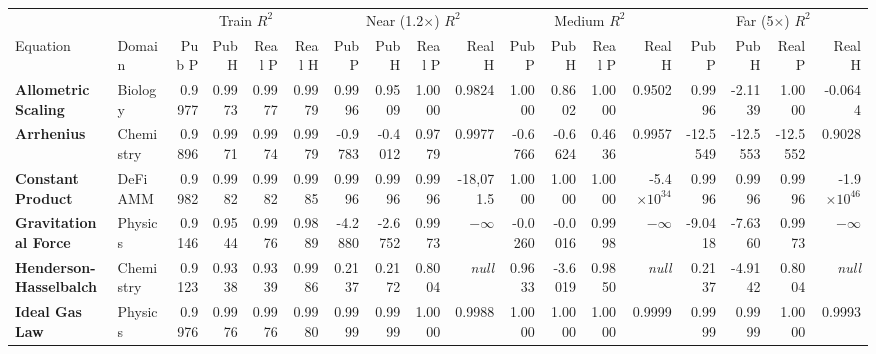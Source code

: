 \documentclass[10pt]{article}
\begin{document}
\begin{landscape}
\begin{adjustbox}{width=\linewidth,center}
\begin{tabular}{l l *{4}{r} *{4}{r} *{4}{r} *{4}{r}}
\toprule
& & \multicolumn{4}{c}{Train $R^2$} & \multicolumn{4}{c}{Near (1.2$\times$) $R^2$} & \multicolumn{4}{c}{Medium $R^2$} & \multicolumn{4}{c}{Far (5$\times$) $R^2$} \\
\cmidrule(lr){3-6} \cmidrule(lr){7-10} \cmidrule(lr){11-14} \cmidrule(lr){15-18}
Equation & Domain & Pub P & Pub H & Real P & Real H & Pub P & Pub H & Real P & Real H & Pub P & Pub H & Real P & Real H & Pub P & Pub H & Real P & Real H \\
\midrule
\textbf{Allometric Scaling} & Biology & 0.9977 & 0.9973 & \cellcolor{match}0.9977 & \cellcolor{match}0.9979 & 0.9996 & 0.9509 & \cellcolor{match}1.0000 & \cellcolor{minor}0.9824 & 1.0000 & 0.8602 & \cellcolor{match}1.0000 & \cellcolor{minor}0.9502 & 0.9996 & -2.1139 & \cellcolor{match}1.0000 & \cellcolor{major}-0.0644 \\
\textbf{Arrhenius} & Chemistry & 0.9896 & 0.9971 & \cellcolor{match}0.9974 & \cellcolor{match}0.9979 & -0.9783 & -0.4012 & \cellcolor{major}0.9779 & \cellcolor{major}0.9977 & -0.6766 & -0.6624 & \cellcolor{major}0.4636 & \cellcolor{major}0.9957 & -12.5549 & -12.5553 & \cellcolor{match}-12.5552 & \cellcolor{major}0.9028 \\
\textbf{Constant Product} & DeFi AMM & 0.9982 & 0.9982 & \cellcolor{match}0.9982 & \cellcolor{match}0.9985 & 0.9996 & 0.9996 & \cellcolor{match}0.9996 & \cellcolor{major}-18{,}071.5 & 1.0000 & 1.0000 & \cellcolor{match}1.0000 & \cellcolor{major}-5.4$\times10^{34}$ & 0.9996 & 0.9996 & \cellcolor{match}0.9996 & \cellcolor{major}-1.9$\times10^{46}$ \\
\textbf{Gravitational Force} & Physics & 0.9146 & 0.9544 & \cellcolor{minor}0.9976 & \cellcolor{minor}0.9889 & -4.2880 & -2.6752 & \cellcolor{major}0.9973 & \cellcolor{major}$-\infty$ & -0.0260 & -0.0016 & \cellcolor{major}0.9998 & \cellcolor{major}$-\infty$ & -9.0418 & -7.6360 & \cellcolor{major}0.9973 & \cellcolor{major}$-\infty$ \\
\textbf{Henderson-Hasselbalch} & Chemistry & 0.9123 & 0.9338 & \cellcolor{minor}0.9339 & \cellcolor{minor}0.9986 & 0.2137 & 0.2172 & \cellcolor{major}0.8004 & \cellcolor{major}\textit{null} & 0.9633 & -3.6019 & \cellcolor{minor}0.9850 & \cellcolor{major}\textit{null} & 0.2137 & -4.9142 & \cellcolor{major}0.8004 & \cellcolor{major}\textit{null} \\
\textbf{Ideal Gas Law} & Physics & 0.9976 & 0.9976 & \cellcolor{match}0.9976 & \cellcolor{match}0.9980 & 0.9999 & 0.9999 & \cellcolor{match}1.0000 & \cellcolor{match}0.9988 & 1.0000 & 1.0000 & \cellcolor{match}1.0000 & \cellcolor{match}0.9999 & 0.9999 & 0.9999 & \cellcolor{match}1.0000 & \cellcolor{match}0.9993 \\

\end{tabular}
\end{adjustbox}
\end{landscape}
\end{document}
